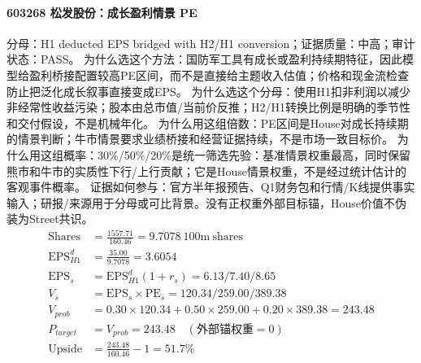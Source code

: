 \paragraph{603268 松发股份：成长盈利情景 PE}
分母：H1 deducted EPS bridged with H2/H1 conversion；证据质量：中高；审计状态：PASS。
为什么选这个方法：国防军工具有成长或盈利持续期特征，因此模型给盈利桥接配置较高PE区间，而不是直接给主题收入估值；价格和现金流检查防止把泛化成长叙事直接变成EPS。
为什么选这个分母：使用H1扣非利润以减少非经常性收益污染；股本由总市值/当前价反推；H2/H1转换比例是明确的季节性和交付假设，不是机械年化。
为什么用这组倍数：PE区间是House对成长持续期的情景判断；牛市情景要求业绩桥接和经营证据持续，不是市场一致目标价。
为什么用这组概率：30\%/50\%/20\%是统一筛选先验：基准情景权重最高，同时保留熊市和牛市的实质性下行/上行贡献；它是House情景权重，不是经过统计估计的客观事件概率。
证据如何参与：官方半年报预告、Q1财务包和行情/K线提供事实输入；研报/来源用于分母或可比背景。没有正权重外部目标锚，House价值不伪装为Street共识。
\begin{align*}
\mathrm{Shares} &= \frac{1557.71}{160.46}=9.7078\ \mathrm{100m\ shares}\\
\mathrm{EPS}_{H1}^d &= \frac{35.00}{9.7078}=3.6054\\
\mathrm{EPS}_s &= \mathrm{EPS}_{H1}^d(1+r_s)=6.13/7.40/8.65\\
V_s &= \mathrm{EPS}_s\times \mathrm{PE}_s=120.34/259.00/389.38\\
V_{prob} &= 0.30\times 120.34+0.50\times 259.00+0.20\times 389.38=243.48\\
P_{target} &= V_{prob}=243.48\quad(\text{外部锚权重}=0)\\
\mathrm{Upside} &= \frac{243.48}{160.46}-1=51.7\%\\
\end{align*}

